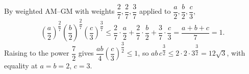 By weighted AM--GM with weights $\dfrac27,\dfrac27,\dfrac37$ applied to $\dfrac a2,\dfrac b2,\dfrac c3$,
\[\left(\dfrac a2\right)^{\dfrac27}\left(\dfrac b2\right)^{\dfrac27}\left(\dfrac c3\right)^{\dfrac37}\le\dfrac27\cdot\dfrac a2+\dfrac27\cdot\dfrac b2+\dfrac37\cdot\dfrac c3=\dfrac{a+b+c}{7}=1.\]
Raising to the power $\dfrac72$ gives $\dfrac{ab}{4}\left(\dfrac c3\right)^{\dfrac32}\le1$, so $ab\,c^{\dfrac32}\le2\cdot2\cdot3^{\dfrac32}=\boxed{12\sqrt3}$, with equality at $a=b=2$, $c=3$.
